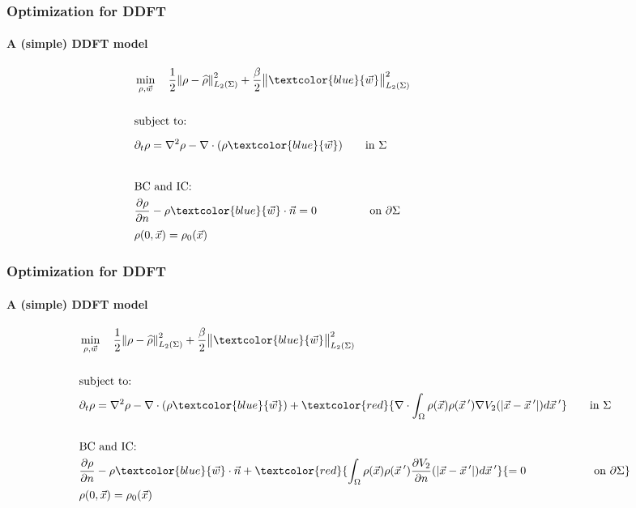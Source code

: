 \documentclass[aspectratio=169,xcolor=dvipsnames]{beamer}
\begin{document}
\begin{frame}
	\frametitle{Optimization for DDFT}
	\framesubtitle{A (simple) DDFT model}
	\begin{align*}
	&\min_{\rho,\vec{w}} \quad \frac{1}{2}\norm{\rho- \widehat{\rho}}_{L_2(\Sigma)}^2 + \frac{\beta}{2} \norm{ \textcolor{blue}{\vec{w}}}_{L_2(\Sigma)}^2\\
	\\
	&\text{subject to:}
	\\
	&{ \partial_t \rho = \nabla^2 \rho - \nabla \cdot (\rho  \textcolor{blue}{\vec{w}})} \qquad { \text{in    } \Sigma \phantom{+\nabla \cdot \int_\Omega \rho(\vec{x}) \rho(\vec{x}\hspace{0.2em}') \nabla V_2(|\vec{x}-\vec{x}\hspace{0.2em}'|)d\vec{x}\hspace{0.2em}'} }\\
	\\
	&{\text{BC } \text{and IC:}}\\
	&{\frac{\partial \rho}{\partial n} - \rho  \textcolor{blue}{\vec{w}} \cdot \vec{n} = 0 \ \ \qquad \qquad \text{on   } \partial \Sigma  }\phantom{+ \int_\Omega \rho(\vec{x}) \rho(\vec{x}\hspace{0.2em}')  \frac{ \partial  V_2}{\partial n}(|\vec{x}-\vec{x}\hspace{0.2em}'|)d\vec{x}\hspace{0.2em}'} { \quad \  } \\
	&{\rho(0,\vec{x}) = \rho_0(\vec{x})} 
\end{align*}
	
\end{frame}
\begin{frame}
	\frametitle{Optimization for DDFT}
	\framesubtitle{A (simple) DDFT model}
	\begin{align*}
		&\min_{\rho,\vec{w}} \quad \frac{1}{2}\norm{\rho- \widehat{\rho}}_{L_2(\Sigma)}^2 + \frac{\beta}{2} \norm{ \textcolor{blue}{\vec{w}}}_{L_2(\Sigma)}^2\\
		\\
		&\text{subject to:}
		\\
		& \partial_t \rho = \nabla^2 \rho - \nabla \cdot (\rho  \textcolor{blue}{\vec{w}})+ \textcolor{red}{\nabla \cdot \int_\Omega \rho(\vec{x}) \rho(\vec{x}\hspace{0.2em}') \nabla V_2(|\vec{x}-\vec{x}\hspace{0.2em}'|)d\vec{x}\hspace{0.2em}'} \qquad { \text{in    } \Sigma}\\
		\\
		&{\text{BC } \text{and IC:}}\\
		&\frac{\partial \rho}{\partial n} - \rho  \textcolor{blue}{\vec{w}} \cdot \vec{n} + \textcolor{red}{ \int_\Omega \rho(\vec{x}) \rho(\vec{x}\hspace{0.2em}')  \frac{ \partial  V_2}{\partial n}(|\vec{x}-\vec{x}\hspace{0.2em}'|)d\vec{x}\hspace{0.2em}'} {= 0 \quad \ \ \ \qquad \qquad \text{on   } \partial \Sigma  } \\
		&{\rho(0,\vec{x}) = \rho_0(\vec{x})} 
	\end{align*}
	
\end{frame}
\end{document}
